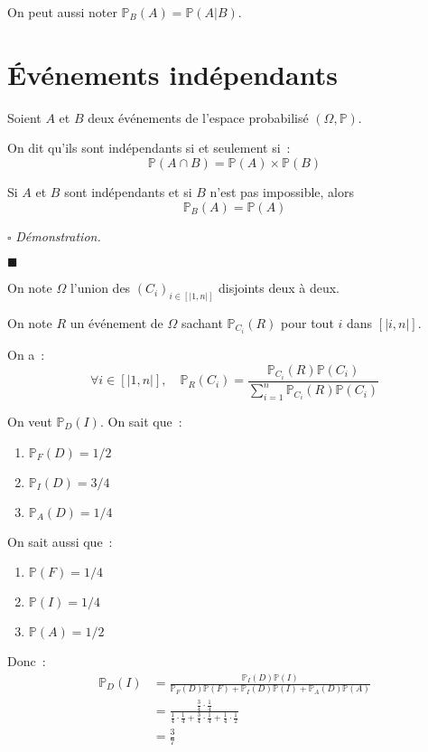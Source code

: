 \documentclass[a4paper, titlepage]{article}
\renewenvironment{proof}{$\square$ \footnotesize\textit{Démonstration.}}{\begin{flushright}$\blacksquare$\end{flushright}}
\begin{document}
	On peut aussi noter $\mathbb{P}_B(A) = \mathbb{P}(A|B)$.
	\section{Événements indépendants}
	\begin{defn}
		Soient $A$ et $B$ deux événements de l'espace probabilisé $(\Omega,\mathbb{P})$.

		On dit qu'ils sont indépendants si et seulement si~:
		$$ \mathbb{P}(A\cap B) = \mathbb{P}(A)\times\mathbb{P}(B) $$
	\end{defn}
	\begin{props}
		Si $A$ et $B$ sont indépendants et si $B$ n'est pas impossible, alors $$ \mathbb{P}_B(A) = \mathbb{P}(A) $$
	\end{props}
	\begin{proof}
		\AQT
	\end{proof}
	\begin{thm}
		On note $\Omega$ l'union des $(C_i)_{i\in[|1,n|]}$ disjoints deux à deux.

		On note $R$ un événement de $\Omega$ sachant $\mathbb{P}_{C_i}(R)$ pour tout $i$ dans $[|i,n|]$.

		On a~:
		$$ \forall i\in[|1,n|],\quad\mathbb{P}_{R}(C_i) = \frac{\mathbb{P}_{C_i}(R)\mathbb{P}(C_i)}{\displaystyle \sum_{i=1}^{n} \mathbb{P}_{C_i}(R)\mathbb{P}(C_i)}$$
	\end{thm}
	\begin{exemple}
		On veut $\mathbb{P}_D(I)$. On sait que~:
		\begin{enumerate}
			\item $\mathbb{P}_F(D) = 1/2$
			\item $\mathbb{P}_I(D) = 3/4$
			\item $\mathbb{P}_A(D) = 1/4$
		\end{enumerate}
		On sait aussi que~:
		\begin{enumerate}
			\item $\mathbb{P}(F)=1/4$
			\item $\mathbb{P}(I)=1/4$
			\item $\mathbb{P}(A)=1/2$
		\end{enumerate}
	Donc~:
	\begin{align*}
		\mathbb{P}_D(I) &= \frac{\mathbb{P}_I(D)\mathbb{P}(I)}{\mathbb{P}_F(D)\mathbb{P}(F)+\mathbb{P}_I(D)\mathbb{P}(I)+\mathbb{P}_A(D)\mathbb{P}(A)} \\
						&= \frac{\frac{3}{4}\cdot \frac{1}{4}}{\frac{1}{4}\cdot \frac{1}{4}+\frac{3}{4}\cdot \frac{1}{4}+\frac{1}{4}\cdot \frac{1}{2}} \\
						&= \frac{3}{7}
	\end{align*}
	\end{exemple}
\end{document}
